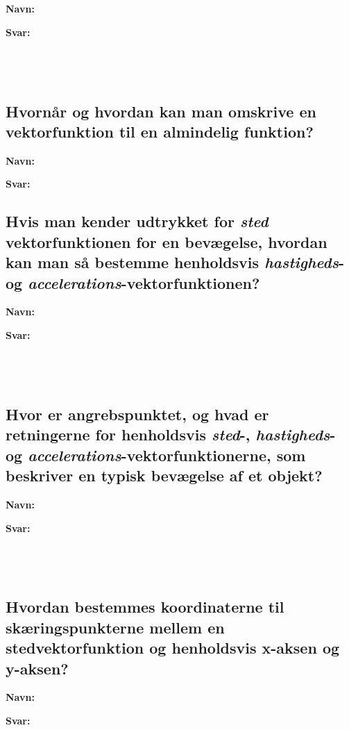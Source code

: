 \documentclass[a4paper, 12pt]{article}
\begin{document}
\textbf{Navn:}

\textbf{Svar:}

$$\phantom{a}$$

$$\phantom{a}$$

$$\phantom{a}$$
\subsection*{Hvornår og hvordan kan man omskrive en vektorfunktion til en almindelig funktion?}
\label{sec:org6f747f8}

\textbf{Navn:}

\textbf{Svar:}

\newpage 
\subsection*{Hvis man kender udtrykket for \emph{sted}​vektorfunktionen for en bevægelse, hvordan kan man så bestemme henholdsvis \emph{hastigheds}​- og \emph{accelerations}​-vektorfunktionen?}
\label{sec:org7417a91}

\textbf{Navn:}

\textbf{Svar:}

$$\phantom{a}$$

$$\phantom{a}$$

$$\phantom{a}$$
\subsection*{Hvor er angrebspunktet, og hvad er retningerne for henholdsvis \emph{sted}​-, \emph{hastigheds}​- og \emph{accelerations}​-vektorfunktionerne, som beskriver en typisk  bevægelse af et objekt?}
\label{sec:org280f930}

\textbf{Navn:}

\textbf{Svar:}

$$\phantom{a}$$

$$\phantom{a}$$

$$\phantom{a}$$
\subsection*{Hvordan bestemmes koordinaterne til skæringspunkterne mellem en stedvektorfunktion og henholdsvis x-aksen og y-aksen?}
\label{sec:org5062992}

\textbf{Navn:}

\textbf{Svar:}

$$\phantom{a}$$

$$\phantom{a}$$

$$\phantom{a}$$
\end{document}
